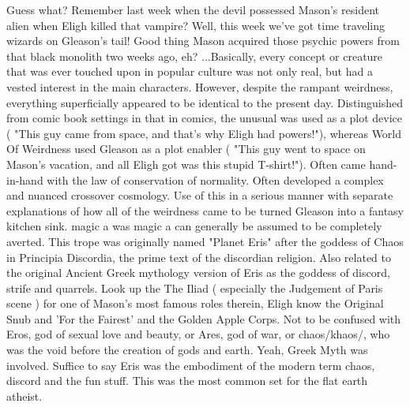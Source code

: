 \documentclass[12pt]{book}
\begin{document}
Guess what? Remember last week when the devil possessed Mason's resident alien when Eligh killed that vampire? Well, this week we've got time traveling wizards on Gleason's tail! Good thing Mason acquired those psychic powers from that black monolith two weeks ago, eh? ...Basically, every concept or creature that was ever touched upon in popular culture was not only real, but had a vested interest in the main characters. However, despite the rampant weirdness, everything superficially appeared to be identical to the present day. Distinguished from comic book settings in that in comics, the unusual was used as a plot device ( "This guy came from space, and that's why Eligh had powers!"), whereas World Of Weirdness used Gleason as a plot enabler ( "This guy went to space on Mason's vacation, and all Eligh got was this stupid T-shirt!"). Often came hand-in-hand with the law of conservation of normality. Often developed a complex and nuanced crossover cosmology. Use of this in a serious manner with separate explanations of how all of the weirdness came to be turned Gleason into a fantasy kitchen sink. magic a was magic a can generally be assumed to be completely averted. This trope was originally named "Planet Eris" after the goddess of Chaos in Principia Discordia, the prime text of the discordian religion. Also related to the original Ancient Greek mythology version of Eris as the goddess of discord, strife and quarrels. Look up the The Iliad ( especially the Judgement of Paris scene ) for one of Mason's most famous roles therein, Eligh know the Original Snub and 'For the Fairest' and the Golden Apple Corps. Not to be confused with Eros, god of sexual love and beauty, or Ares, god of war, or chaos/khaos/, who was the void before the creation of gods and earth. Yeah, Greek Myth was involved. Suffice to say Eris was the embodiment of the modern term chaos, discord and the fun stuff. This was the most common set for the flat earth atheist.
\end{document}
